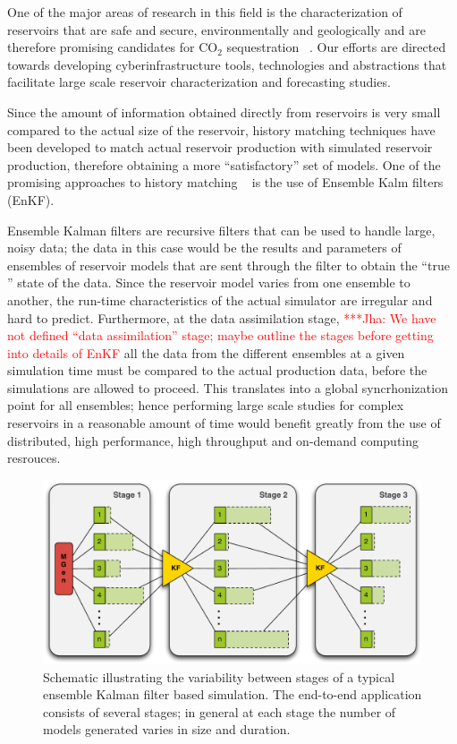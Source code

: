 \documentclass[conference,final]{IEEEtran}
\newcommand{\jhanote}[1]{ {\textcolor{red} { ***Jha: #1 }}}
\newcommand{\jhanote}[1]{}
\begin{document}
One of the major areas of research in this field is the characterization of reservoirs that are safe and secure, environmentally and geologically and are therefore promising candidates for CO$_2$ sequestration ~\cite{GeoRPT,Luigi}. Our efforts are directed towards developing cyberinfrastructure tools, technologies and abstractions that facilitate large scale reservoir characterization and forecasting studies.

Since the amount of information obtained directly from reservoirs is very small compared to the actual size of the reservoir, history matching techniques have been developed to match actual reservoir production with simulated reservoir production, therefore obtaining a more ``satisfactory'' set of models. One of the promising approaches to history matching ~\cite{KalmanPaper, DO2007, LiEnKF07, DO2006} is the use of Ensemble Kalm filters (EnKF).

Ensemble Kalman filters are recursive filters that can be used to handle large, noisy data; the data in this case would be the results and parameters of ensembles of reservoir models that are sent through the filter to obtain the ``true '' state of the data. Since the reservoir model varies from one ensemble to another, the run-time characteristics of the actual simulator are irregular and hard to predict. Furthermore, at the data assimilation stage, \jhanote{We have not defined ``data assimilation'' stage; maybe outline the stages before getting into details of EnKF} all the data from the different ensembles at a given simulation time must be compared to the actual production data, before the simulations are allowed to proceed. This translates into a global syncrhonization point for all ensembles; hence performing large scale studies for complex reservoirs in a reasonable amount of time would benefit greatly from the use of distributed, high performance, high throughput and on-demand computing resrouces.

\begin{figure}
\begin{center}
\includegraphics*[scale=0.33,angle=0]{figures/3StageKalmanFilter}
\end{center}
\caption{Schematic illustrating the variability between stages of a typical
  ensemble Kalman filter based simulation. The end-to-end
  application consists of several stages; in general at each stage the
  number of models generated varies in size and duration.}
\label{fig:irregular_execution}
\end{figure}
\end{document}
